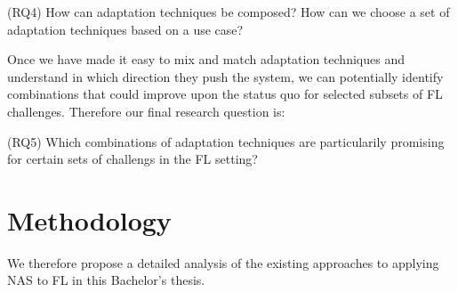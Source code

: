 (RQ4) How can adaptation techniques be composed? How can we choose a set of adaptation techniques based on a use case?

Once we have made it easy to mix and match adaptation techniques and understand in which direction they push the system, we can potentially identify combinations that could improve upon the status quo for selected subsets of FL challenges. Therefore our final research question is:

(RQ5) Which combinations of adaptation techniques are particularily promising for certain sets of challengs in the FL setting?

\section{Methodology}


We therefore propose a detailed analysis of the existing approaches to applying NAS to FL in this Bachelor's thesis.
